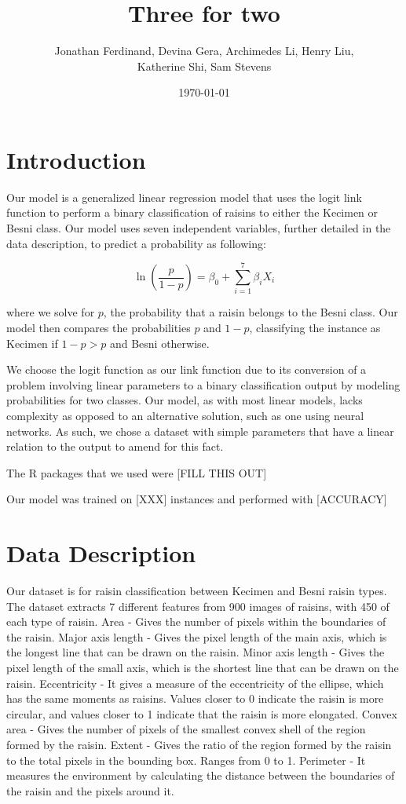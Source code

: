 \documentclass{article}
\title{Three for two}
\author{Jonathan Ferdinand, Devina Gera, Archimedes Li, Henry Liu, \\Katherine Shi, Sam Stevens}
\date{\today}
\begin{document}
\maketitle

\section{Introduction}
Our model is a generalized linear regression model that uses the logit link function to perform a binary classification of raisins to either the Kecimen or Besni class. Our model uses seven independent variables, further detailed in the data description, to predict a probability as following:

$$\ln \left( \frac{p}{1-p}\right) = \beta_0 + \sum_{i=1}^{7} \beta_i X_i$$

where we solve for $p$, the probability that a raisin belongs to the Besni class. Our model then compares the probabilities $p$ and $1-p$, classifying the instance as Kecimen if $1-p > p$ and Besni otherwise.

We choose the logit function as our link function due to its conversion of a problem involving linear parameters to a binary classification output by modeling probabilities for two classes. Our model, as with most linear models, lacks complexity as opposed to an alternative solution, such as one using neural networks. As such, we chose a dataset with simple parameters that have a linear relation to the output to amend for this fact.

The R packages that we used were [FILL THIS OUT]

Our model was trained on [XXX] instances and performed with [ACCURACY]%

\section{Data Description}
Our dataset is for raisin classification between Kecimen and Besni raisin types.  The dataset extracts 7 different features from 900 images of raisins, with 450 of each type of raisin.
Area - Gives the number of pixels within the boundaries of the raisin.
Major axis length - Gives the pixel length of the main axis, which is the longest line that can be drawn on the raisin.
Minor axis length - Gives the pixel length of the small axis, which is the shortest line that can be drawn on the raisin.
Eccentricity - It gives a measure of the eccentricity of the ellipse, which has the same moments as raisins.  Values closer to 0 indicate the raisin is more circular, and values closer to 1 indicate that the raisin is more elongated.
Convex area - Gives the number of pixels of the smallest convex shell of the region formed by the raisin.
Extent - Gives the ratio of the region formed by the raisin to the total pixels in the bounding box.  Ranges from 0 to 1.
Perimeter - It measures the environment by calculating the distance between the boundaries of the raisin and the pixels around it.
\clearpage
\end{document}
